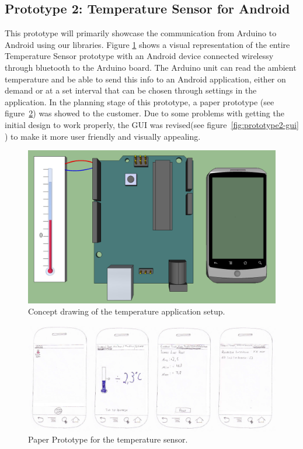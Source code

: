 	
\subsection{Prototype 2: Temperature Sensor for Android}
This prototype will primarily showcase the communication from Arduino to Android using our libraries. 
Figure \ref{fig:design-temperature} shows a visual representation of the entire Temperature Sensor
prototype with an Android device connected wirelessy through bluetooth to the Arduino board. The 
Arduino unit can read the ambient temperature and be able to send this info to an Android application,
 either on demand or at a set interval that can be chosen through settings in the application. 
In the planning stage of this prototype, a paper prototype (see figure~\ref{fig:prototype2-paper}) was showed to the
customer. Due to some problems with getting the initial design to work properly, the GUI was revised(see
figure~\ref{fig:prototype2-gui} ) to make it more user friendly and visually appealing.

\begin{figure}[H]
	\centering
	\includegraphics[scale=0.35]{img/design-temperature}
	\caption{Concept drawing of the temperature application setup.}
	\label{fig:design-temperature}
\end{figure}

\begin{figure}[H]
\centering 
\includegraphics[width=1.0\textwidth]{img/prototype2-paper.png}
\caption{Paper Prototype for the temperature sensor.}
\label{fig:prototype2-paper}
\end{figure}

